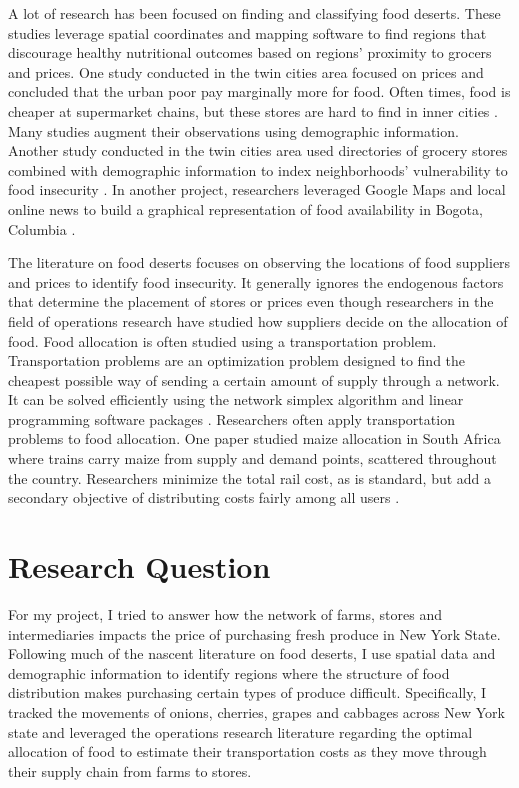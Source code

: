 \documentclass{report}
\begin{document}
A lot of research has been focused on finding and classifying food deserts. These studies leverage spatial coordinates and mapping software to find regions that discourage healthy nutritional outcomes based on regions' proximity to grocers and prices. One study conducted in the twin cities area focused on prices and concluded that the urban poor pay marginally more for food. Often times, food is cheaper at supermarket chains, but these stores are hard to find in inner cities \cite{Chung}. Many studies augment their observations using demographic information. Another study conducted in the twin cities area used directories of grocery stores combined with demographic information to index neighborhoods' vulnerability to food insecurity \cite{Larson}. In another project, researchers leveraged Google Maps and local online news to build a graphical representation of food availability in Bogota, Columbia \cite{Hwang}. 

The literature on food deserts focuses on observing the locations of food suppliers and prices to identify food insecurity. It generally ignores the endogenous factors that determine the placement of stores or prices even though researchers in the field of operations research have studied how suppliers decide on the allocation of food. Food allocation is often studied using a transportation problem. Transportation problems are an optimization problem designed to find the cheapest possible way of sending a certain amount of supply through a network. It can be solved efficiently using the network simplex algorithm and linear programming software packages \cite{Cook}. Researchers often apply transportation problems to food allocation. One paper studied maize allocation in South Africa where trains carry maize from supply and demand points, scattered throughout the country. Researchers minimize the total rail cost, as is standard, but add a secondary objective of distributing costs fairly among all users \cite{Stewart}.

\section{Research Question} 

For my project, I tried to answer how the network of farms, stores and intermediaries impacts the price of purchasing fresh produce in New York State. Following much of the nascent literature on food deserts, I use spatial data and demographic information to identify regions where the structure of food distribution makes purchasing certain types of produce difficult. Specifically, I tracked the movements of onions, cherries, grapes and cabbages across New York state and leveraged the operations research literature regarding the optimal allocation of food to estimate their transportation costs as they move through their supply chain from farms to stores. 
\end{document}
